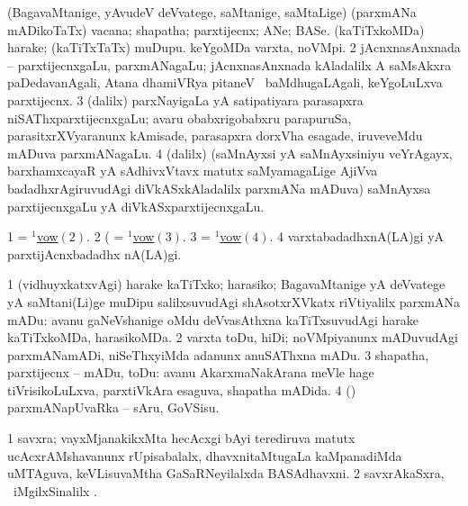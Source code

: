 \bentry 
{} 
\gl{\nA}
\expl{}
\bmng
\bnum
{} (BagavaMtanige, yAvudeV deVvatege, saMtanige, saMtaLige) 
\banum
{} (parxmANa mADikoTaTx) vacana; shapatha; parxtijecnx; ANe; BASe. 
 (kaTiTxkoMDa) harake; (kaTiTxTaTx) muDupu. 
 keYgoMDa varxta, noVMpi. 
\hypertarget{vow(1)2}{} 
\eanum
\numie
\num{2} jAcnxnasAnxnada -- parxtijecnxgaLu, parxmANagaLu; jAcnxnasAnxnada kAladalilx A saMsAkxra paDedavanAgali, Atana dhamiVRya pitaneV \mo\ baMdhugaLAgali, keYgoLuLxva parxtijecnx. 
\hypertarget{vow(1)3}{} 
\num{3} (\bava dalilx) parxNayigaLa yA satipatiyara parasapxra niSAThxparxtijecnxgaLu; avaru obabxrigobabxru parapuruSa, parasitxrXVyaranunx kAmisade, parasapxra dorxVha esagade, iruveveMdu mADuva parxmANagaLu. 
\hypertarget{vow(1)4}{} 
\num{4} (\bava dalilx) (saMnAyxsi yA saMnAyxsiniyu veYrAgayx, barxhamxcayaR yA sAdhivxVtavx matutx saMyamagaLige AjiVva badadhxrAgiruvudAgi diVkASxkAladalilx parxmANa mADuva) saMnAyxsa parxtijecnxgaLu yA diVkASxparxtijecnxgaLu. 
\enum
\emng

\noindent 
\gl{\pagu}
\expl{}
\bmng
\bnum
\num{1}  = \hyperlink{vow(1)2}{$^1$vow\((2)\)}. 
\num{2}  (  = \hyperlink{vow(1)3}{$^1$vow\((3)\)}. 
\num{3}  = \hyperlink{vow(1)4}{$^1$vow\((4)\)}. 
\num{4}  varxtabadadhxnA(LA)gi yA parxtijAcnxbadadhx nA(LA)gi. 
\enum
\emng
\eentry

\bentry
{} 
\pron{}
\gl{\sakirx}
\expl{}
\bmng
\bnum
\num{1} (vidhuyxkatxvAgi) harake kaTiTxko; harasiko; BagavaMtanige yA deVvatege yA saMtani(Li)ge muDipu salilxsuvudAgi shAsotxrXVkatx riVtiyalilx parxmANa mADu:  avanu gaNeVshanige oMdu deVvasAthxna kaTiTxsuvudAgi harake kaTiTxkoMDa, harasikoMDa. 
\num{2} varxta toDu, hiDi; noVMpiyanunx mADuvudAgi parxmANamADi, niSeThxyiMda adanunx anuSAThxna mADu. 
\num{3} shapatha, parxtijecnx -- mADu, toDu:  avanu AkarxmaNakArana meVle hage tiVrisikoLuLxva, parxtiVkAra esaguva, shapatha mADida. 
\num{4} (\pArxparx) parxmANapUvaRka -- sAru, GoVSisu. 
\enum
\emng
\eentry

\bentry
{} 
\gl{\nA}
\expl{}
\bmng
\bnum
\num{1} savxra; vayxMjanakikxMta hecAcxgi bAyi terediruva matutx ucAcxrAMshavanunx rUpisabalalx, dhavxnitaMtugaLa kaMpanadiMda uMTAguva, keVLisuvaMtha GaSaRNeyilalxda BASAdhavxni. 
\num{2} savxrAkaSxra, \udA\ iMgilxSinalilx . 
\enum
\emng

